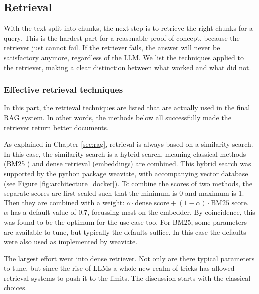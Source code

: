 \subsection{Retrieval}
With the text split into chunks, the next step is to retrieve the right chunks for a query. This is the hardest part for a reasonable proof of concept, because the retriever just cannot fail. If the retriever fails, the answer will never be satisfactory anymore, regardless of the LLM. We list the techniques applied to the retriever, making a clear distinction between what worked and what did not.

\subsubsection{Effective retrieval techniques}
In this part, the retrieval techniques are listed that are actually used in the final RAG system. In other words, the methods below all successfully made the retriever return better documents.

As explained in Chapter \ref{sec:rag}, retrieval is always based on a similarity search. In this case, the similarity search is a hybrid search, meaning classical methods (BM25 \cite{robertson2009probabilistic}) and dense retrieval (embeddings) are combined. This hybrid search was supported by the python package weaviate, with accompanying vector database (see Figure \ref{fig:architecture_docker}). To combine the scores of two methods, the separate scores are first scaled such that the minimum is 0 and maximum is 1. Then they are combined with a weight: $\alpha \cdot \text{dense score} + (1-\alpha) \cdot \text{BM25 score}$. $\alpha$ has a default value of 0.7, focussing most on the embedder. By coincidence, this was found to be the optimum for the use case too. For BM25, some parameters are available to tune, but typically the defaults suffice. In this case the defaults were also used as implemented by weaviate.

The largest effort went into dense retriever. Not only are there typical parameters to tune, but since the rise of LLMs a whole new realm of tricks has allowed retrieval systems to push it to the limits. The discussion starts with the classical choices.

